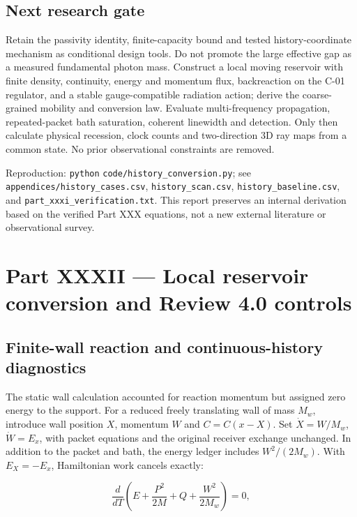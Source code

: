 \documentclass[
  11pt,
  twoside]{article}
\begin{document}
\subsection{Next research gate}\label{next-research-gate}

Retain the passivity identity, finite-capacity bound and tested
history-coordinate mechanism as conditional design tools. Do not promote
the large effective gap as a measured fundamental photon mass. Construct
a local moving reservoir with finite density, continuity, energy and
momentum flux, backreaction on the C-01 regulator, and a stable
gauge-compatible radiation action; derive the coarse-grained mobility
and conversion law. Evaluate multi-frequency propagation,
repeated-packet bath saturation, coherent linewidth and detection. Only
then calculate physical recession, clock counts and two-direction 3D ray
maps from a common state. No prior observational constraints are
removed.

Reproduction: \texttt{python} \nolinkurl{code/history_conversion.py};
see \nolinkurl{appendices/history_cases.csv},
\nolinkurl{history_scan.csv}, \nolinkurl{history_baseline.csv}, and
\nolinkurl{part_xxxi_verification.txt}. This report preserves an
internal derivation based on the verified Part XXX equations, not a new
external literature or observational survey.

\section{Part XXXII --- Local reservoir conversion and Review 4.0
controls}\label{part-xxxii-local-reservoir-conversion-and-review-4.0-controls}

\subsection{Finite-wall reaction and continuous-history
diagnostics}\label{finite-wall-reaction-and-continuous-history-diagnostics}

The static wall calculation accounted for reaction momentum but assigned
zero energy to the support. For a reduced freely translating wall of
mass \(M_w\), introduce wall position \(X\), momentum \(W\) and
\(C=C(x-X)\). Set \(\dot X=W/M_w\), \(\dot W=E_x\), with packet
equations and the original receiver exchange unchanged. In addition to
the packet and bath, the energy ledger includes \(W^2/(2M_w)\). With
\(E_X=-E_x\), Hamiltonian work cancels exactly:

\[\frac{d}{dT}\left(E+\frac{P^2}{2M}+Q+\frac{W^2}{2M_w}\right)=0,\tag{H1}\]
\end{document}
